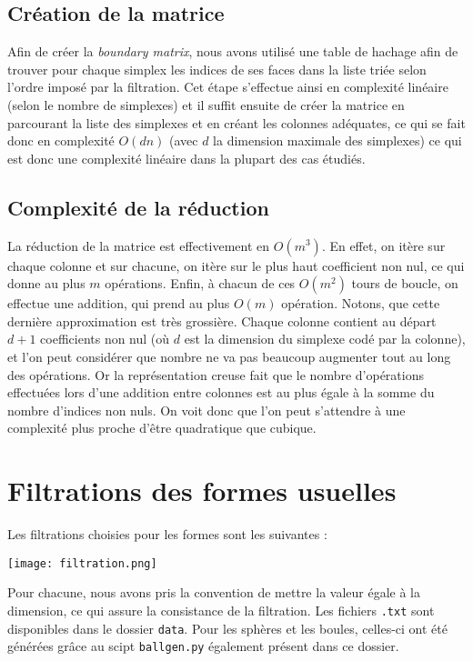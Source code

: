 \documentclass[french, a4paper, 12pt]{article}
\begin{document}
\subsection{Création de la matrice}

Afin de créer la \textit{boundary matrix}, nous avons utilisé une
table de hachage afin de trouver pour chaque simplex les indices
de ses faces dans la liste triée selon l'ordre imposé par la
filtration. Cet étape s'effectue ainsi en complexité linéaire 
(selon le nombre de simplexes) et il suffit 
ensuite de créer la matrice en parcourant la liste des simplexes 
et en créant les colonnes adéquates, ce qui se fait donc en 
complexité $O(dn)$ (avec $d$ la dimension maximale des simplexes)
ce qui est donc une complexité linéaire dans la plupart des cas
étudiés.

\subsection{Complexité de la réduction}

La réduction de la matrice est effectivement en $O(m^3 )$. En 
effet, on itère sur chaque colonne et sur chacune, on itère sur le 
plus haut coefficient non nul, ce qui donne au plus $m$ opérations. 
Enfin, à chacun de ces $O(m^2 )$ tours de boucle, on effectue une 
addition, qui prend au plus $O(m)$ opération. Notons, que cette 
dernière approximation est très grossière. Chaque colonne contient 
au départ $d+1$ coefficients non nul (où $d$ est la dimension du 
simplexe codé par la colonne), et l’on peut considérer que nombre
ne va pas beaucoup augmenter tout au long des opérations. Or la 
représentation creuse fait que le nombre d’opérations effectuées 
lors d’une addition entre colonnes est au plus égale à la somme du 
nombre d’indices non nuls. On voit donc que l’on peut s’attendre à 
une complexité plus proche d’être quadratique que cubique.

\section{Filtrations des formes usuelles}

Les filtrations choisies pour les formes sont les suivantes : 

\texttt{[image: filtration.png]}

Pour chacune, nous avons pris la convention de mettre la valeur 
égale à la dimension, ce qui assure la consistance de la filtration. 
Les fichiers \texttt{.txt} sont disponibles dans le dossier 
\texttt{data}. Pour les sphères et les boules, celles-ci ont été 
générées grâce au scipt \texttt{ballgen.py} également présent dans
ce dossier.
\end{document}
